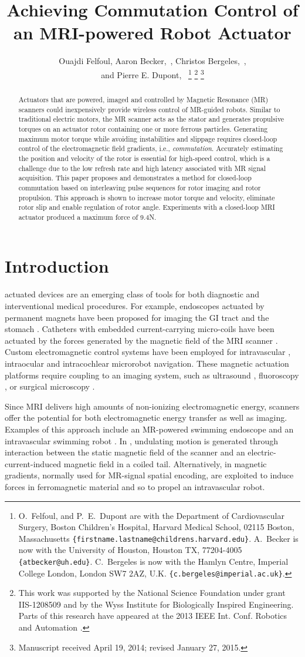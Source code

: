 \documentclass[journal]{IEEEtran}
\title{\LARGE \bf
Achieving Commutation Control of an MRI-powered Robot Actuator
}
\author{Ouajdi Felfoul, 
Aaron Becker,~\IEEEmembership{Member,~IEEE}, 
Christos Bergeles,~\IEEEmembership{Member,~IEEE}, \\
and Pierre E. Dupont,~\IEEEmembership{Fellow,~IEEE}%
\thanks{O.\ Felfoul, and P.~E.~Dupont are with the Department of Cardiovascular Surgery, Boston Children's Hospital, Harvard Medical School, 02115 Boston, Massachusetts {\tt\small \{firstname.lastname@childrens.harvard.edu\}}.
 A.~Becker is now with the University of Houston, Houston TX, 77204-4005 {\tt\small \{atbecker@uh.edu\}}.
C.~Bergeles is now with the Hamlyn Centre, Imperial College London, London SW7 2AZ, U.K. {\tt\small \{c.bergeles@imperial.ac.uk\}}.
}%
\thanks{This work was supported by the National Science Foundation under grant IIS-1208509 and by the Wyss Institute for Biologically Inspired Engineering. Parts of this research have appeared at the 2013 IEEE Int. Conf. Robotics and Automation \cite{bergeles2013closed}.}
\thanks{Manuscript received April 19, 2014; revised January 27, 2015.}}
\begin{document}
\maketitle

\begin{abstract}
Actuators that are powered, imaged and controlled by Magnetic Resonance ({MR}) scanners could inexpensively provide wireless control of MR-guided robots. Similar to traditional electric motors, the MR scanner acts as the stator and generates propulsive torques on an actuator rotor containing one or more ferrous particles. Generating maximum motor torque while avoiding instabilities and slippage requires closed-loop control of the electromagnetic field gradients, i.e., \emph{commutation}. Accurately estimating the position and velocity of the rotor is essential for high-speed control, which is a challenge due to the low refresh rate and high latency associated with MR signal acquisition. This paper proposes and demonstrates a method for closed-loop commutation based on interleaving pulse sequences for rotor imaging and rotor propulsion. This approach is shown to increase motor torque and velocity, eliminate rotor slip and enable regulation of rotor angle. Experiments with a closed-loop MRI actuator produced a maximum force of 9.4N.
\end{abstract}

\section{Introduction}
\label{sec:introduction}
 actuated devices are an emerging class of tools for both diagnostic and interventional medical procedures. For example, endoscopes actuated by permanent magnets have been proposed for imaging the GI tract \cite{tognarelli2012magnetic} and the stomach \cite{yim2012design}. Catheters with embedded current-carrying micro-coils have been actuated by the forces generated by the magnetic field of the MRI scanner \cite{Cenk2014Catheter}. Custom electromagnetic control systems have been employed for intravascular \cite{yu2010novel}, intraocular \cite{ulrich2013mobility} and intracochlear \cite{clark2012magnetic} microrobot navigation. These magnetic actuation platforms require coupling to an imaging system, such as ultrasound \cite{tognarelli2012magnetic}, fluoroscopy \cite{yu2010novel}, or surgical microscopy \cite{ulrich2013mobility}.

Since MRI delivers high amounts of non-ionizing electromagnetic energy, scanners offer the potential for both electromagnetic energy transfer as well as imaging. Examples of this approach include an MR-powered swimming endoscope \cite{kosa2012mri} and an intravascular swimming robot \cite{chanu2008adapting} \cite{mathieu2006method}. In \cite{kosa2012mri}, undulating motion is generated through interaction between the static magnetic field of the scanner and an electric-current-induced magnetic field in a coiled tail. Alternatively, in \cite{chanu2008adapting} \cite{mathieu2006method} magnetic gradients, normally used for MR-signal spatial encoding, are exploited to induce forces in ferromagnetic material and so to propel an intravascular robot.
\end{document}
